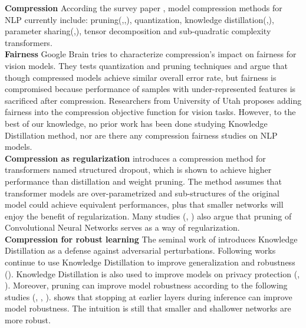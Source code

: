 
\noindent \textbf{Compression} \quad According the survey paper \cite{Gupta2020CompressionOD}, model compression methods for NLP currently include: pruning(\citet{Michel2019AreSH},\citet{Voita2019AnalyzingMS},\citet{Prasanna2020WhenBP}), quantization\cite{Cheong2019transformersZ}, knowledge distillation(\citet{Jiao2020TinyBERTDB},\citet{Iandola2020SqueezeBERTWC}), parameter sharing(\citet{Lan2020ALBERTAL},\citet{Lan2020ALBERTAL}), tensor decomposition and sub-quadratic complexity transformers. \\

\noindent \textbf{Fairness} \quad Google Brain \cite{Hooker2020CharacterisingBI} tries to characterize compression's impact on fairness for vision models. They tests quantization and pruning techniques and argue that though compressed models achieve similar overall error rate, but fairness is compromised because performance of samples with under-represented features is sacrificed after compression. Researchers from University of Utah \cite{Joseph2020GoingBC} proposes adding fairness into the compression objective function for vision tasks. However, to the best of our knowledge, no prior work has been done studying Knowledge Distillation method, nor are there any compression fairness studies on NLP models.\\

\noindent \textbf{Compression as regularization} \quad 
\cite{Fan2020ReducingTD} introduces a compression method for transformers named structured dropout, which is shown to achieve higher performance than distillation and weight pruning. The method assumes that transformer models are over-parametrized and sub-structures of the original model could achieve equivalent performances, plus that smaller networks will enjoy the benefit of regularization. Many studies (\citet{Jordo2021OnTE}, \citet{Bartoldson2020TheGT}) also argue that pruning of Convolutional Neural Networks serves as a way of regularization. \\

\noindent \textbf{Compression for robust learning} \quad
The seminal work of \cite{Papernot2016DistillationAA} introduces Knowledge Distillation as a defense against adversarial perturbations. Following works continue to use Knowledge Distillation to improve generalization \cite{Arani2019ImprovingGA} and robustness (\citet{Goldblum2020AdversariallyRD}). Knowledge Distillation is also used to improve models on privacy protection (\citet{Shejwalkar2019ReconcilingUA}, \citet{Zhao2021KnowledgeDW}). Moreover, pruning can improve model robustness according to the following studies (\citet{Jordo2021OnTE}, \citet{Pang2021BagOT},\citet{Hendrycks2019BenchmarkingNN} ). \cite{Kaya2019ShallowDeepNU} shows that stopping at earlier layers during inference can improve model robustness. The intuition is still that smaller and shallower networks are more robust.\\

